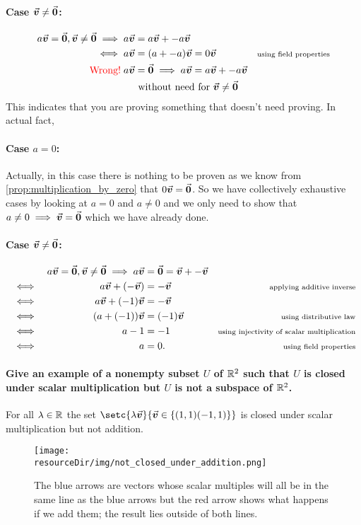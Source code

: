 \documentclass[MathsNotesBase.tex]{subfiles}
\begin{document}
		\paragraph{Case $\vec{\bm{v}} \neq \vec{\bm{0}}$:}
		\begin{align*}	 	
	 	a\v = \0, \v \neq \0 \implies a\v &=a\v + -a\v &\\
	 	\iff a\v &= (a + -a)\v = 0\v &\sidecomment{using field properties} \\
	 	\wrong\; a\v &= \0 \implies  a\v =a\v + -a\v &\\
	 	&\text{ without need for } \v \neq \0 &\\
	 	\end{align*}
		This indicates that you are proving something that doesn't need proving. In actual fact,
		\paragraph{Case $a = 0$:}
		Actually, in this case there is nothing to be proven as we know from \autoref{prop:multiplication_by_zero} that $0\vec{\bm{v}} = \vec{\bm{0}}$. So we have collectively exhaustive cases by looking at $a = 0$ and $a \neq 0$ and we only need to show that $a \neq 0 \implies \vec{\bm{v}} = \vec{\bm{0}}$ which we have already done.
		\paragraph{Case $\vec{\bm{v}} \neq \vec{\bm{0}}$:}
		\begin{align*}	 	
		&& a\vec{\bm{v}} = \vec{\bm{0}}, \vec{\bm{v}} \neq \vec{\bm{0}} \implies a\vec{\bm{v}} &= \vec{\bm{0}} = \vec{\bm{v}} + -\vec{\bm{v}} &\\
		&\iff & a\vec{\bm{v}} + (-\vec{\bm{v}}) &= -\vec{\bm{v}} &\text{\scriptsize{applying additive inverse}} \\
		&\iff & a\vec{\bm{v}} + (-1)\vec{\bm{v}} &= -\vec{\bm{v}} &\text{\scriptsize{}} \\
		&\iff & (a + (-1))\vec{\bm{v}} &= (-1)\vec{\bm{v}} &\text{\scriptsize{using distributive law}} \\
		&\iff & a - 1 &= -1 &\text{\scriptsize{using injectivity of scalar multiplication}} \\
		&\iff & a &= 0. &\text{\scriptsize{using field properties}} \\
		\end{align*}

	
	\paragraph{\small{Give an example of a nonempty subset $U$ of $\mathbb{R}^{2}$ such that $U$ is closed under scalar multiplication but $U$ is not a subspace of $\mathbb{R}^{2}$.}}	
	For all $\lambda \in \mathbb{R}^{}$ the set $\setc{\lambda\v}{\v \in \{(1,1) (-1,1)\} }$ is closed under scalar multiplication but not addition.
	\begin{figure}[h!]
	 \texttt{[image: \\resourceDir/img/not\_closed\_under\_addition.png]}
	 \caption{The blue arrows are vectors whose scalar multiples will all be in the same line as the blue arrows but the red arrow shows what happens if we add them; the result lies outside of both lines.}
	\end{figure}
	
\end{document}
